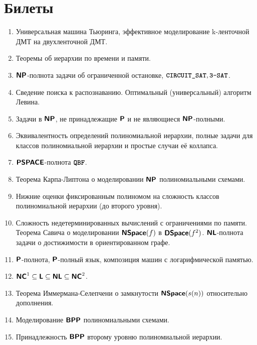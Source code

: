 \documentclass[11pt]{article}
\begin{document}
\section{Билеты}
\begin{enumerate}[noitemsep]
	\item Универсальная машина Тьюринга, эффективное моделирование k-ленточной ДМТ на двухленточной ДМТ.
	\item Теоремы об иерархии по времени и памяти.
	\item $\NP$-полнота задачи об ограниченной остановке, $\CircuitSat, \ThreeSAT$.
	\item Сведение поиска к распознаванию. Оптимальный (универсальный) алгоритм Левина.
	\item Задачи в $\NP$, не принадлежащие $\P$ и не являющиеся $\NP$-полными.
	\item Эквивалентность определений полиномиальной иерархии, полные задачи для классов полиномиальной иерархии и простые случаи её коллапса.
	\item $\PSPACE$-полнота $\QBF$.
	\item Теорема Карпа-Липтона о моделировании $\NP$ полиномиальными схемами.
	\item Нижние оценки фиксированным полиномом на сложность классов полиномиальной иерархии (до второго уровня).
	\item  Сложность недетерминированных вычислений с ограничениями по памяти. Теорема Савича о моделировании $\NSpace(f)$ в $\DSpace(f^2)$. $\NL$-полнота задачи о достижимости в ориентированном графе.
	\item  $\P$-полнота, $\P$-полный язык, композиция машин с логарифмической памятью.
	\item  $\NC^1 \subseteq \L \subseteq \NL \subseteq \NC^2$.
	\item  Теорема Иммермана-Селепчени о замкнутости $\NSpace(s(n))$ относительно дополнения.
	\item  Моделирование $\BPP$ полиномиальными схемами.
	\item  Принадлежность $\BPP$ второму уровню полиномиальной иерархии.
\end{enumerate}
\end{document}
